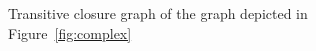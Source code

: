 \documentclass[11pt]{report}
\begin{document}
\begin{figure}[!ht]
      \caption{Transitive closure graph of the graph depicted in Figure~\ref{fig:complex}}
      \label{fig:transitive} 
\end{figure}
\end{document}
